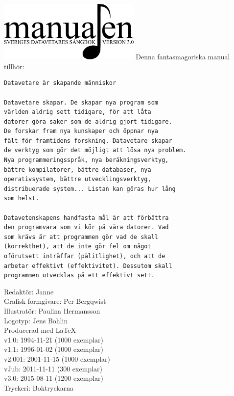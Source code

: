 \documentclass[a6paper,fontsize=10pt,twoside,open=right]{scrbook}
\makeatletter
\def\cleardoublepage{%
  \ifodd\c@page%
  \else%
    \ohead{}%
    \null%
    \newpage%
  \fi%
}%
\makeatother
\begin{document}
\vspace*{6.5cm}
\hspace*{0.9cm}
\includegraphics[keepaspectratio,width=7cm]{elements/logo.pdf}
\clearpage
\noindent Denna fantasmagoriska manual tillhör:
\ohead{\textnormal{\textsc{\scriptsize\leftmark}}}
\ofoot[\pagemark]{\textsc{\scriptsize\pagemark}}
\clearpage
{}
{\small\begin{verbatim}
Datavetare är skapande människor

Datavetare skapar. De skapar nya program som
världen aldrig sett tidigare, för att låta
datorer göra saker som de aldrig gjort tidigare.
De forskar fram nya kunskaper och öppnar nya
fält för framtidens forskning. Datavetare skapar
de verktyg som gör det möjligt att lösa nya problem.
Nya programmeringsspråk, nya beräkningsverktyg,
bättre kompilatorer, bättre databaser, nya
operativsystem, bättre utvecklingsverktyg,
distribuerade system... Listan kan göras hur lång
som helst.
  
Datavetenskapens handfasta mål är att förbättra
den programvara som vi kör på våra datorer. Vad
som krävs är att programmen gör vad de skall
(korrekthet), att de inte gör fel om något
oförutsett inträffar (pålitlighet), och att de
arbetar effektivt (effektivitet). Dessutom skall
programmen utvecklas på ett effektivt sett.
\end{verbatim}}
\vspace{10pt}
\clearpage
\setlength{\parindent}{15pt}
\null
\vfill
    {\noindent\small\centering
      Redaktör: Janne\\
      Grafisk formgivare: Per Bergqwist\\
      Illustratör: Paulina Hermansson\\
      Logotyp: Jens Bohlin\\
      Producerad med \LaTeX\\
      v1.0: 1994-11-21 (1000 exemplar)\\
      v1.1: 1996-01-02 (1000 exemplar)\\
      v2.001: 2001-11-15 (1000 exemplar)\\
      vJub: 2011-11-11 (300 exemplar)\\
      v3.0: 2015-08-11 (1200 exemplar)\\
      Tryckeri: Boktryckarna\par
    }
\cleardoublepage
\end{document}
